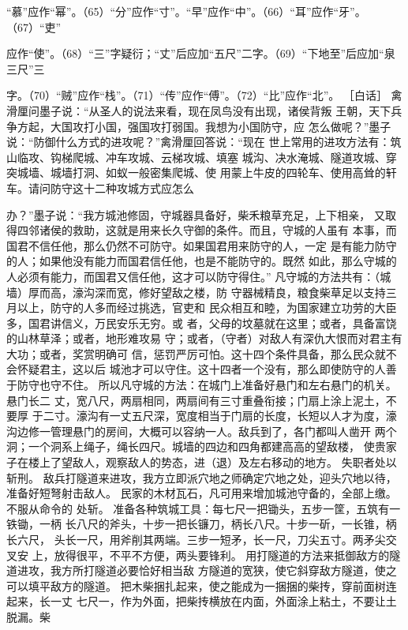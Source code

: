 \documentclass[12pt,UTF8]{ctexbook}
\begin{document}
“慕”应作“幂”。（65）“分”应作“寸”。“早”应作“中”。（66）“耳”应作“牙”。（67）“吏” 

应作“使”。（68）“三”字疑衍；“丈”后应加“五尺”二字。（69）“下地至”后应加“泉三尺”三 

字。（70）“贼”应作“栈”。（71）“传”应作“傅”。（72）“比”应作“北”。 
［白话］ 
禽滑厘问墨子说：“从圣人的说法来看，现在凤鸟没有出现，诸侯背叛 
王朝，天下兵争方起，大国攻打小国，强国攻打弱国。我想为小国防守，应 
怎么做呢？”墨子说：“防御什么方式的进攻呢？”禽滑厘回答说：“现在 
世上常用的进攻方法有：筑山临攻、钩梯爬城、冲车攻城、云梯攻城、填塞 
城沟、决水淹城、隧道攻城、穿突城墙、城墙打洞、如蚁一般密集爬城、使 
用蒙上牛皮的四轮车、使用高耸的轩车。请问防守这十二种攻城方式应怎么 

办？”墨子说：“我方城池修固，守城器具备好，柴禾粮草充足，上下相亲， 
又取得四邻诸侯的救助，这就是用来长久守御的条件。而且，守城的人虽有 
本事，而国君不信任他，那么仍然不可防守。如果国君用来防守的人，一定 
是有能力防守的人；如果他没有能力而国君信任他，也是不能防守的。既然 
如此，那么守城的人必须有能力，而国君又信任他，这才可以防守得住。” 
凡守城的方法共有：（城墙）厚而高，濠沟深而宽，修好望敌之楼，防 
守器械精良，粮食柴草足以支持三月以上，防守的人多而经过挑选，官吏和 
民众相互和睦，为国家建立功劳的大臣多，国君讲信义，万民安乐无穷。或 
者，父母的坟墓就在这里；或者，具备富饶的山林草泽；或者，地形难攻易 
守；或者，（守者）对敌人有深仇大恨而对君主有大功；或者，奖赏明确可 
信，惩罚严厉可怕。这十四个条件具备，那么民众就不会怀疑君主，这以后 
城池才可以守住。这十四者一个没有，那么即使防守的人善于防守也守不住。 
所以凡守城的方法：在城门上准备好悬门和左右悬门的机关。悬门长二 
丈，宽八尺，两扇相同，两扇间有三寸重叠衔接；门扇上涂上泥土，不要厚 
于二寸。濠沟有一丈五尺深，宽度相当于门扇的长度，长短以人才为度，濠 
沟边修一管理悬门的房间，大概可以容纳一人。敌兵到了，各门都叫人凿开 
两个洞；一个洞系上绳子，绳长四尺。城墙的四边和四角都建高高的望敌楼， 
使贵家子在楼上了望敌人，观察敌人的势态，进（退）及左右移动的地方。 
失职者处以斩刑。 
敌兵打隧道来进攻，我方立即派穴地之师确定穴地之处，迎头穴地以待， 
准备好短弩射击敌人。 
民家的木材瓦石，凡可用来增加城池守备的，全部上缴。不服从命令的 
处斩。 
准备各种筑城工具：每七尺一把锄头，五步一筐，五筑有一铁锄，一柄 
长八尺的斧头，十步一把长镰刀，柄长八尺。十步一斫，一长锥，柄长六尺， 
头长一尺，用斧削其两端。三步一短矛，长一尺，刀尖五寸。两矛尖交叉安 
上，放得很平，不平不方便，两头要锋利。 
用打隧道的方法来抵御敌方的隧道进攻，我方所打隧道必要恰好相当敌 
方隧道的宽狭，使它斜穿敌方隧道，使之可以填平敌方的隧道。 
把木柴捆扎起来，使之能成为一捆捆的柴抟，穿前面树连起来，长一丈 
七尺一，作为外面，把柴抟横放在内面，外面涂上粘土，不要让土脱漏。柴 
\end{document}

